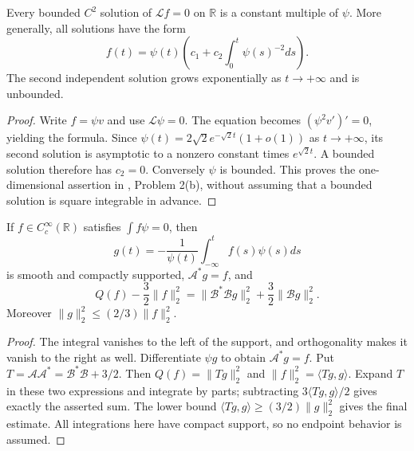 \begin{proposition}\label{prop:phase-bounded-normal-kernel}
Every bounded $C^2$ solution of $\mathscr Lf=0$ on $\mathbb R$ is a constant multiple of $\psi$. More generally, all solutions have the form
\[
 f(t)=\psi(t)\left(c_1+c_2\int_0^t\psi(s)^{-2}ds\right).
\]
The second independent solution grows exponentially as $t\to+\infty$ and is unbounded.
\end{proposition}
\begin{proof}
Write $f=\psi v$ and use $\mathscr L\psi=0$. The equation becomes $(\psi^2v')'=0$, yielding the formula. Since $\psi(t)=2\sqrt2 e^{-\sqrt2t}(1+o(1))$ as $t\to+\infty$, its second solution is asymptotic to a nonzero constant times $e^{\sqrt2t}$. A bounded solution therefore has $c_2=0$. Conversely $\psi$ is bounded. This proves the one-dimensional assertion in \cite{ChAC}, Problem 2(b), without assuming that a bounded solution is square integrable in advance.
\end{proof}

\begin{lemma}\label{lem:phase-adjoint-primitive}
If $f\in C_c^\infty(\mathbb R)$ satisfies $\int f\psi=0$, then
\[
 g(t)=-\frac1{\psi(t)}\int_{-\infty}^t f(s)\psi(s)ds
\]
is smooth and compactly supported, $\mathcal A^*g=f$, and
\[
 Q(f)-\frac32\|f\|_2^2
 =\|\mathcal B^*\mathcal B g\|_2^2+\frac32\|\mathcal B g\|_2^2.
\]
Moreover $\|g\|_2^2\leq(2/3)\|f\|_2^2$.
\end{lemma}
\begin{proof}
The integral vanishes to the left of the support, and orthogonality makes it vanish to the right as well. Differentiate $\psi g$ to obtain $\mathcal A^*g=f$. Put $T=\mathcal A\mathcal A^*=\mathcal B^*\mathcal B+3/2$. Then
$Q(f)=\|Tg\|_2^2$ and $\|f\|_2^2=\langle Tg,g\rangle$.
Expand $T$ in these two expressions and integrate by parts; subtracting $3\langle Tg,g\rangle/2$ gives exactly the asserted sum. The lower bound $\langle Tg,g\rangle\geq(3/2)\|g\|_2^2$ gives the final estimate. All integrations here have compact support, so no endpoint behavior is assumed.
\end{proof}


